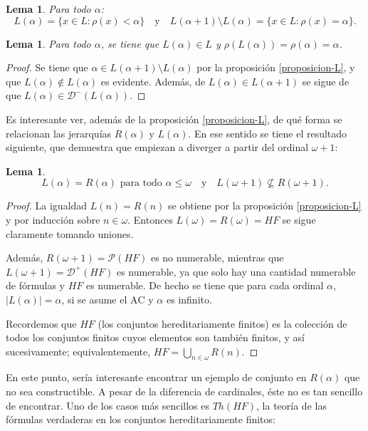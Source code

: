 \documentclass[11pt,a4paper]{book}
\theoremstyle{plain}
\newtheorem{lema}[teorema]{Lema}
\theoremstyle{definition}
\theoremstyle{remark}
\begin{document}
\begin{lema}
Para todo $\alpha$:
\[
L(\alpha) = \{x \in L : \rho(x) < \alpha\}
\quad \text{y} \quad
L(\alpha+1) \setminus L(\alpha) = \{x \in L : \rho(x) = \alpha\}.
\]
\end{lema}

\begin{lema}
Para todo $\alpha$, se tiene que $L(\alpha) \in L$ y $\rho(L(\alpha)) = \rho(\alpha) = \alpha$.
\end{lema}

\begin{proof}
Se tiene que $\alpha \in L(\alpha+1) \setminus L(\alpha)$ por la proposición \ref{proposicion-L}, y que $L(\alpha) \notin L(\alpha)$ es evidente. Además, de $L(\alpha) \in L(\alpha+1)$ se sigue de que $L(\alpha) \in \mathcal{D}^-(L(\alpha))$.
\end{proof}

Es interesante ver, además de la proposición \ref{proposicion-L}, de qué forma se relacionan las jerarquías $R(\alpha)$ y $L(\alpha)$. En ese sentido se tiene el resultado siguiente, que demuestra que empiezan a diverger a partir del ordinal $\omega + 1$:

\begin{lema}

  \[
L(\alpha) = R(\alpha) \text{ para todo } \alpha \leq \omega 
\quad \text{y} \quad 
L(\omega + 1) \nsubseteq R(\omega + 1).
\]

\end{lema}

\begin{proof}
La igualdad $L(n) = R(n)$ se obtiene por la proposición \ref{proposicion-L} y por inducción sobre 
$n \in \omega$. Entonces $L(\omega) = R(\omega) = HF$ se sigue claramente tomando uniones.

Además, $R(\omega+1) = \mathcal{P}(HF)$ es no numerable, mientras que 
$L(\omega+1) = \mathcal{D}^+(HF)$ es numerable, ya que solo hay una cantidad 
numerable de fórmulas y $HF$ es numerable. De hecho se tiene que para cada ordinal $\alpha$, $|L(\alpha)| = \alpha$, si se asume el $\mathrm{AC}$ y $\alpha$ es infinito.

Recordemos que $HF$ (los conjuntos hereditariamente finitos) es la colección de todos los 
conjuntos finitos cuyos elementos son también finitos, y así sucesivamente; equivalentemente,
$HF = \bigcup_{n \in \omega} R(n)$.
\end{proof}

En este punto, sería interesante encontrar un ejemplo de conjunto en $R(\alpha)$ que no sea constructible. A pesar de la diferencia de cardinales, éste no es tan sencillo de encontrar. Uno de los casos más sencillos es $Th(HF)$, la teoría de las fórmulas verdaderas en los conjuntos hereditariamente finitos:
\end{document}
